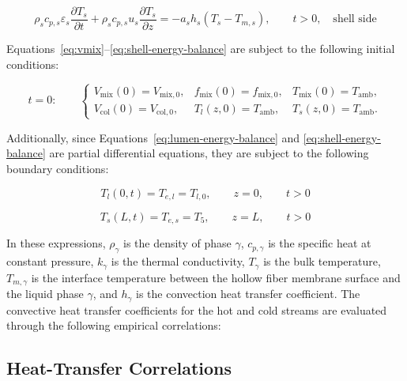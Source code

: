\documentclass[14pt,letterpaper,fleqn]{extarticle}
\begin{document}
\begin{equation}
\rho_s c_{p,s}\varepsilon_s
\frac{\partial T_s}{\partial t}
+
\rho_s c_{p,s}u_s
\frac{\partial T_s}{\partial z}
=
-a_s h_s
\left(
T_s-T_{m,s}
\right),
\qquad
t>0,
\quad
\text{shell side}
\label{eq:shell-energy-balance}
\end{equation}

Equations~\eqref{eq:vmix}--\eqref{eq:shell-energy-balance} are subject to the
following initial conditions:

\begin{equation}
t=0:
\qquad
\left\{
\begin{array}{lll}
V_{\mathrm{mix}}(0)=V_{\mathrm{mix},0},
&
f_{\mathrm{mix}}(0)=f_{\mathrm{mix},0},
&
T_{\mathrm{mix}}(0)=T_{\mathrm{amb}},
\\[4pt]
V_{\mathrm{col}}(0)=V_{\mathrm{col},0},
&
T_l(z,0)=T_{\mathrm{amb}},
&
T_s(z,0)=T_{\mathrm{amb}}.
\end{array}
\right.
\label{eq:initial-conditions}
\end{equation}

Additionally, since Equations~\eqref{eq:lumen-energy-balance} and
\eqref{eq:shell-energy-balance} are partial differential equations, they are
subject to the following boundary conditions:

\begin{equation}
T_l(0,t)
=
T_{e,l}
=
T_{l,0},
\qquad
z=0,
\qquad
t>0
\label{eq:lumen-boundary-condition}
\end{equation}

\begin{equation}
T_s(L,t)
=
T_{e,s}
=
T_{5},
\qquad
z=L,
\qquad
t>0
\label{eq:shell-boundary-condition}
\end{equation}

In these expressions, $\rho_\gamma$ is the density of phase $\gamma$,
$c_{p,\gamma}$ is the specific heat at constant pressure, $k_\gamma$ is the thermal
conductivity, $T_\gamma$ is the bulk temperature, $T_{m,\gamma}$ is the interface
temperature between the hollow fiber membrane surface and the liquid phase $\gamma$,
and $h_\gamma$ is the convection heat transfer coefficient. The convective heat
transfer coefficients for the hot and cold streams are evaluated through the following
empirical correlations:

\subsection*{Heat-Transfer Correlations}
\end{document}
